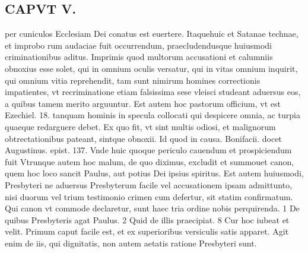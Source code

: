 \documentclass{article}
\begin{document}
\begin{pages}
\section*{CAPVT  V. }
\marginpar{[ p.33 ]}\pstart per cuniculos Ecclesiam Dei conatus est euertere. Itaquehuic et Satanae technae, et improbo rum audaciae fuit occurrendum, praecludendusque huiusmodi criminationibus aditus. Imprimis quod multorum accusationi et calumniis obnoxius esse solet, qui in omnium oculis versatur, qui in vitas omnium inquirit, qui omnium vitia reprehendit, tam sunt nimirum homines correctionis impatientes, vt recriminatione etiam falsissima sese vleisci studeant aduersus eos, a quibus tamem merito arguuntur. Est autem hoc pastorum officium, vt est Ezechiel. 18. tanquam hominis in specula collocati qui despicere omnia, ac turpia quaeque redarguere debet. Ex quo fit, vt sint multis odiosi, et malignorum obtrectationibus pateant, sintque obnoxii. Id quod in causa. Bonifacii. docet Augustinus. epist. 137. Vnde huic quoque periculo cauendum et prospiciendum fuit Vtrunque autem hoc malum, de quo diximus, excludit et summouet canon, quem hoc loco sancit Paulus, aut potius Dei ipsius spiritus. Est autem huiusmodi, Presbyteri ne aduersus Presbyterum facile vel accusationem ipsam admittunto, nisi duorum vel trium testimonio crimen cum defertur, sit statim confirmatum. Qui canon vt commode declaretur, sunt haec tria ordine nobis perquirenda. 1 De quibus Presbyteris agat Paulus. 2 Quid de illis praecipiat. 8 Cur hoc iubeat et velit. Primum caput facile est, et ex superioribus versiculis satis apparet. Agit enim de iis, qui dignitatis, non autem aetatis ratione Presbyteri sunt.  \pend

\end{pages}
\end{document}
